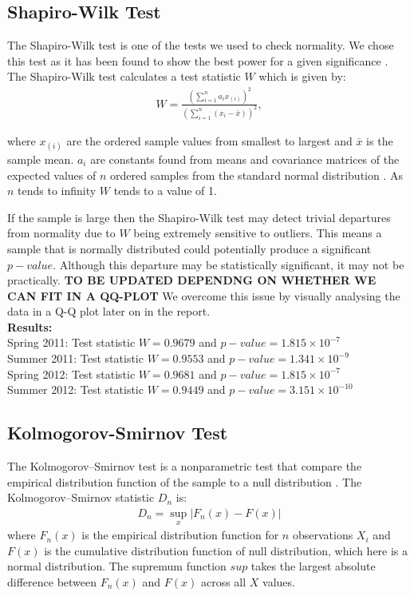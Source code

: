 \subsection{Shapiro-Wilk Test}
The Shapiro-Wilk test is one of the tests we used to check normality. We chose this test as it has been found to show the best power for a given significance \cite{shapiropower}. The Shapiro-Wilk test calculates a test statistic $W$ which is given by: \\
\begin{eqnarray}
\ W = \frac{\left(\sum_{i=1}^{n} a_i x_{(i)}\right)^2}{(\sum_{i=1}^{n} (x_i-\bar{x}))^2},
\end{eqnarray}

where $x_{(i)}$ are the ordered sample values from smallest to largest and $\bar{x}$ is the sample mean. $a_i$ are constants found from means and covariance matrices of the expected values of $n$ ordered samples from the standard normal distribution . As $n$ tends to infinity $W$ tends to a value of 1.  

If the sample is large then the Shapiro-Wilk test may detect trivial departures from normality due to $W$ being extremely sensitive to outliers. This means a sample that is normally distributed could potentially produce a significant $p-value$. Although this departure may be statistically significant, it may not be practically. \textbf{TO BE UPDATED DEPENDNG ON WHETHER WE CAN FIT IN A QQ-PLOT} We overcome this issue by visually analysing the data in a Q-Q plot later on in the report. \\
\textbf{Results:} ~\\
Spring 2011: Test statistic $W=0.9679$ and $p-value = 1.815\times10^{-7}$ \\
Summer 2011: Test statistic $W= 0.9553$ and $p-value = 1.341\times10^{-9}$ \\
Spring 2012: Test statistic $W=0.9681$ and $p-value = 1.815\times10^{-7}$ \\
Summer 2012: Test statistic $W= 0.9449$ and $p-value = 3.151\times10^{-10}$


\subsection{Kolmogorov-Smirnov Test}

The Kolmogorov–Smirnov test is a nonparametric test that compare the empirical distribution function of the sample to a null distribution \cite{berger2014kolmogorov}. The Kolmogorov–Smirnov statistic $D_n$ is:
\begin{eqnarray}
\ D_n = \sup_{x} |F_n(x)-F(x)|
\end{eqnarray}
where $F_n(x)$ is the empirical distribution function for $n$ observations $X_i$ and $F(x)$ is the cumulative distribution function of null distribution, which here is a normal distribution. The supremum function $sup$ takes the largest absolute difference between $F_n(x)$ and $F(x)$ across all $X$ values.

